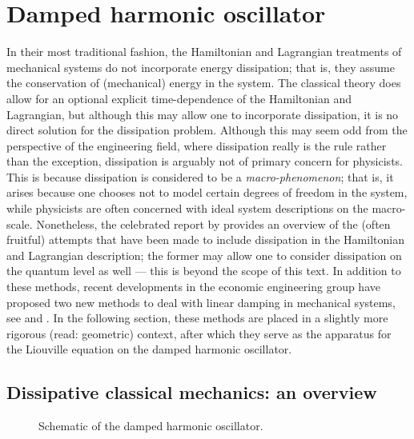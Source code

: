 \chapter{Damped harmonic oscillator}
In their most traditional fashion, the Hamiltonian and Lagrangian treatments of mechanical systems do not incorporate energy dissipation; that is, they assume the conservation of (mechanical) energy in the system. The classical theory does allow for an optional explicit time-dependence of the Hamiltonian and Lagrangian, but although this may allow one to incorporate dissipation, it is no direct solution for the dissipation problem. Although this may seem odd from the perspective of the engineering field, where dissipation really is the rule rather than the exception, dissipation is arguably not of primary concern for physicists. This is because dissipation is considered to be a \emph{macro-phenomenon}; that is, it arises because one chooses not to model certain degrees of freedom in the system, while physicists are often concerned with ideal system descriptions on the macro-scale. Nonetheless, the celebrated report by \citet{Dekker1981} provides an overview of the (often fruitful) attempts that have been made to include dissipation in the Hamiltonian and Lagrangian description; the former may allow one to consider dissipation on the quantum level as well --- this is beyond the scope of this text. In addition to these methods, recent developments in the economic engineering group have proposed two new methods to deal with linear damping in mechanical systems, see \citet{Hutters2020a} and \citet{Mendel2021}. In the following section, these methods are placed in a slightly more rigorous (read: geometric) context, after which they serve as the apparatus for the Liouville equation on the damped harmonic oscillator.

\section{Dissipative classical mechanics: an overview}
\begin{figure}[ht]
    \centering
    
    \caption{Schematic of the damped harmonic oscillator.}
    \label{fig:dho}
\end{figure}

